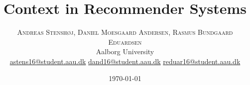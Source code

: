 %
%
%
%




\setlength{\droptitle}{-4\baselineskip} %

\pretitle{\begin{center}\Huge\bfseries} %
\posttitle{\end{center}} %
\title{Context in Recommender Systems} %
\author{%
\textsc{Andreas Stenshøj, Daniel Moesgaard Andersen, Rasmus Bundgaard Eduardsen} \\[1ex] %
\normalsize Aalborg University \\ %
\normalsize \href{mailto:astens16@student.aau.dk}{astens16@student.aau.dk} %
\normalsize \href{mailto:dand16@student.aau.dk}{dand16@student.aau.dk} %
\normalsize \href{mailto:reduar16@student.aau.dk}{reduar16@student.aau.dk} %
}
\date{\today} %
\renewcommand{\maketitlehookd}{%
\begin{abstract}
\noindent \blindtext %
\end{abstract}
}




\maketitle

